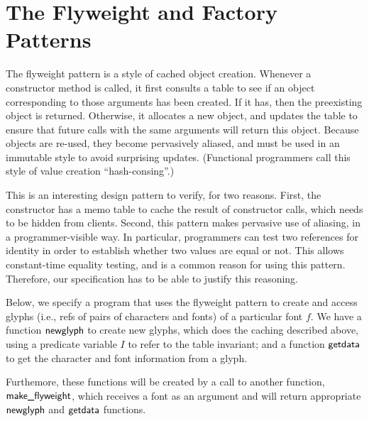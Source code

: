 \documentclass[preprint,natbib]{sigplanconf}
\begin{document}
\section{The Flyweight and Factory Patterns}

The flyweight pattern is a style of cached object creation. Whenever a
constructor method is called, it first consults a table to see if an
object corresponding to those arguments has been created. If it has,
then the preexisting object is returned.  Otherwise, it allocates a
new object, and updates the table to ensure that future calls with the
same arguments will return this object. Because objects are re-used,
they become pervasively aliased, and must be used in an immutable
style to avoid surprising updates. (Functional programmers call this
style of value creation ``hash-consing''.)

This is an interesting design pattern to verify, for two reasons.
First, the constructor has a memo table to cache the result of
constructor calls, which needs to be hidden from clients. Second, this
pattern makes pervasive use of aliasing, in a programmer-visible
way. In particular, programmers can test two references for identity
in order to establish whether two values are equal or not. This allows
constant-time equality testing, and is a common reason for using this
pattern. Therefore, our specification has to be able to justify this
reasoning.

Below, we specify a program that uses the flyweight pattern to create
and access glyphs (i.e., refs of pairs of characters and fonts) of a
particular font $f$. We have a function $\mbox{\textsf{{newglyph}}}$ to create
new glyphs, which does the caching described above, using a predicate
variable $I$ to refer to the table invariant; and a function
$\mbox{\textsf{{getdata}}}$ to get the character and font information from a
glyph.

Furthemore, these functions will be created by a call to another
function, $\mbox{\textsf{{make\_flyweight}}}$, which receives a font as an
argument and will return appropriate $\mbox{\textsf{{newglyph}}}$ and
$\mbox{\textsf{{getdata}}}$ functions. 
\end{document}
